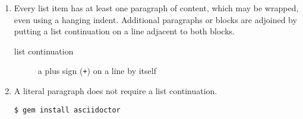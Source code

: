 \begin{enumerate}
\item Every list item has at least one paragraph of content,
which may be wrapped, even using a hanging indent.
Additional paragraphs or blocks are adjoined by putting
a list continuation on a line adjacent to both blocks.
\begin{description}
\item[list continuation]a plus sign ({\tt +}) on a line by itself
\end{description}
\item A literal paragraph does not require a list continuation.
\begin{verbatim}
$ gem install asciidoctor
\end{verbatim}
\end{enumerate}
